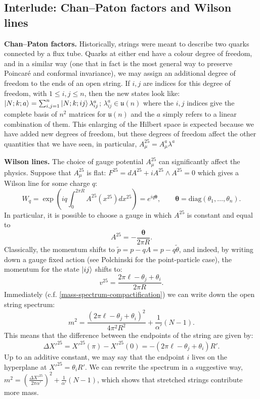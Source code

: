 \documentclass{report}
\theoremstyle{plain}
\theoremstyle{definition}
\theoremstyle{remark}
\newcommand{\FR}[2]{\frac{#1}{#2}}
\newcommand{\lam}{\lambda}
\begin{document}
\subsection{Interlude: Chan--Paton factors and Wilson lines}
\textbf{Chan--Paton factors.} Historically, strings were meant to describe
two quarks connected by a flux tube. Quarks at either end have a colour
degree of freedom, and in a similar way (one that in fact is the most
general way to preserve Poincar\'e and conformal invariance), we may assign
an additional degree of freedom to the ends of an open string. If $i,j$ are
indices for this degree of freedom, with $1\le i,j\le n$, then the new
states look like: $\ket{N;k;a} = \sum_{i,j=1}^n
\ket{N;k;ij}\lambda^a_{ij}$; $\lambda^a_{ij} \in \mathfrak u(n)$ where the
$i,j$ indices give the complete basis of $n^2$ matrices for $\mathfrak
u(n)$ and the $a$ simply refers to a linear combination of them.
This enlarging of the Hilbert space is expected because we have added new
degrees of freedom, but these degrees of freedom affect the other
quantities that we have seen, in particular, $A^{25}_\mu = A_\mu^a\lam^a$

\textbf{Wilson lines.} 
The choice of gauge potential $A^{25}_\mu$ can significantly affect the
physics. Suppose that $A^{25}_\mu$ is flat: $F^{25} = dA^{25} +
iA^{25}\wedge A^{25}=0$ which gives a Wilson line for some charge $q$:
\[W_q = \exp \left( iq\int_0^{2\pi R}A^{25}(x^{25})dx^{25} \right) =
e^{iq\bm\theta},\qquad\bm\theta=\mathrm{diag}(\theta_1,\ldots,\theta_n).\]
In particular, it is possible to choose a gauge in which $A^{25}$ is
constant and equal to \[A^{25}=-\FR{\bm\theta}{2\pi R}.\]
Classically, the momentum shifts to $\tilde p = p-qA = p-q\tilde\theta$,
and indeed, by writing down a gauge fixed action (see Polchinski for the
point-particle case), the momentum for the state $\ket{ij}$ shifts to: 
\[ v^{25} = \FR{2\pi\ell -\theta_j+\theta_i}{2\pi R}.\]
Immediately (c.f. \eqref{mass-spectrum-compactification}) we can write down
the open string spectrum:
\[m^2=\FR{(2\pi\ell-\theta_j+\theta_i)^2}{4\pi^2R^2}+\FR{1}{\alpha'}(N-1).\]
This means that the difference between the endpoints of the string are
given by: \[\Delta X'^{25} = X'^{25}(\pi)-X'^{25}(0) =
-(2\pi\ell-\theta_j+\theta_i)R'.\] Up to an additive constant, we may say
that the endpoint $i$ lives on the hyperplane at $X'^{25} = \theta_i R'$.
We can rewrite the spectrum in a suggestive way, $m^2 = \left( \FR{\Delta
X'^{25}}{2\pi\alpha'}\right)^2+\FR{1}{\alpha'}(N-1)$, which shows that
stretched strings contribute more mass.
\end{document}
